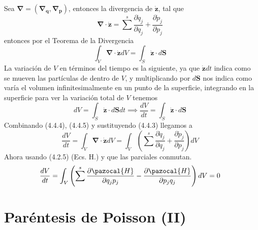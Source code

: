 Sea $\mathbf{\nabla} = (\mathbf{\nabla}_\textbf{q},\mathbf{\nabla}_\textbf{p})$, entonces la divergencia de $\dot{\mathbf{z}}$, tal que
\begin{equation} \label{4.3.4}
    \mathbf{\nabla} \cdot \dot{\mathbf{z}} = \sum^s \frac{\partial \dot{q}_j}{\partial q_j} + \frac{\partial \dot{p}_j}{\partial p_j}
\end{equation} 
entonces por el Teorema de la Divergencia
\begin{equation} \label{4.3.5}
    \int_V{\mathbf{\nabla} \cdot \dot{\mathbf{z}} dV} = \int_S \dot{\mathbf{z}} \cdot d\mathbf{S}
\end{equation} 
La variación de $V$ en términos del tiempo es la siguiente, ya que $\dot{\mathbf{z}}dt$ indica como se mueven las partículas de dentro de $V$, y multiplicando por $d\mathbf{S}$ nos indica como varía el volumen infinitesimalmente en un punto de la superficie, integrando en la superficie para ver la variación total de $V$ tenemos
\begin{equation} \label{4.3.6}
    dV=\int_S \dot{\mathbf{z}} \cdot d\mathbf{S} dt \implies \frac{dV}{dt} = \int_S \dot{\mathbf{z}} \cdot d\mathbf{S}
\end{equation} 
Combinando (4.4.4), (4.4.5) y sustituyendo (4.4.3) llegamos a 
\begin{equation} \label{4.3.7}
    \frac{dV}{dt} = \int_V{\mathbf{\nabla} \cdot \dot{\mathbf{z}} dV} = \int_V{\left(\sum^s \frac{\partial \dot{q}_j}{\partial q_j} + \frac{\partial \dot{p}_j}{\partial p_j}\right)dV}
\end{equation} 
Ahora usando (4.2.5) (Ecs. H.) y que las parciales conmutan.
\begin{equation} \label{4.3.8}
    \frac{dV}{dt} = \int_V{\left(\sum^s \frac{\partial \pazocal{H}}{\partial q_j p_j} - \frac{\partial \pazocal{H}}{\partial p_j q_j}\right)dV} = 0
\end{equation} 


\section{Paréntesis de Poisson (II)} 